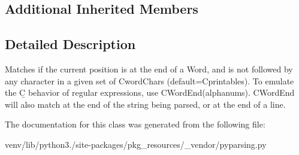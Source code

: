 \subsection*{Additional Inherited Members}


\subsection{Detailed Description}
\begin{DoxyVerb}Matches if the current position is at the end of a Word, and
is not followed by any character in a given set of C{wordChars}
(default=C{printables}). To emulate the C{\b} behavior of regular expressions,
use C{WordEnd(alphanums)}. C{WordEnd} will also match at the end of
the string being parsed, or at the end of a line.
\end{DoxyVerb}
 

The documentation for this class was generated from the following file\+:\begin{DoxyCompactItemize}
\item 
venv/lib/python3./site-\/packages/pkg\+\_\+resources/\+\_\+vendor/pyparsing.\+py\end{DoxyCompactItemize}
